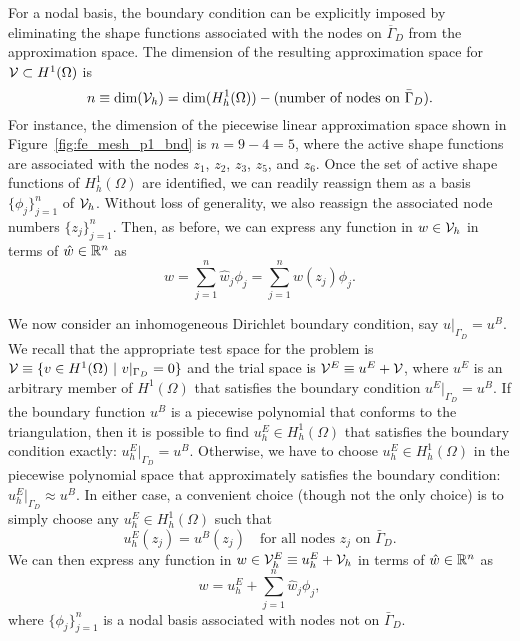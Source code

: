 For a nodal basis, the boundary condition can be explicitly imposed by eliminating the shape functions associated with the nodes on $\overline \Gamma_D$ from the approximation space. The dimension of the resulting approximation space for $\mathcal{V} \subset H^1(\Omega)$ is
\begin{equation*}
  n \equiv \text{dim}(\mathcal{V}_h) = \text{dim}(H^1_h(\Omega)) - (\text{number of nodes on $\bar \Gamma_D$}).
\end{equation*}
For instance, the dimension of the piecewise linear approximation space shown in Figure~\ref{fig:fe_mesh_p1_bnd} is $n = 9 - 4 = 5$, where the active shape functions are associated with the nodes $z_1$, $z_2$, $z_3$, $z_5$, and $z_6$. Once the set of active shape functions of $H^1_h(\Omega)$ are identified, we can readily reassign them as a basis $\{ \phi_j \}_{j=1}^n$ of $\mathcal{V}_h$. Without loss of generality, we also reassign the associated node numbers $\{z_j\}_{j=1}^n$. Then, as before, we can express any function in $w \in \mathcal{V}_h$ in terms of $\hat w \in \mathbb{R}^n$ as
\begin{equation*}
  w = \sum_{j=1}^{n} \hat w_j \phi_j = \sum_{j=1}^{n} w(z_j) \phi_j.
\end{equation*}

We now consider an inhomogeneous Dirichlet boundary condition, say $u|_{\Gamma_D} = u^B$. We recall that the appropriate test space for the problem is $\calV \equiv \{ v \in H^1(\Omega) \ | \ v|_{\Gamma_D} = 0 \}$ and the trial space is $\mathcal{V}^E \equiv u^E + \mathcal{V}$, where $u^E$ is an arbitrary member of $H^1(\Omega)$ that satisfies the boundary condition $u^E|_{\Gamma_D} = u^B$.  If the boundary function $u^B$ is a piecewise polynomial that conforms to the triangulation, then it is possible to find $u^E_h \in H^1_h(\Omega)$ that satisfies the boundary condition exactly: $u^E_h|_{\Gamma_D} = u^B$.  Otherwise, we have to choose $u^E_h \in H^1_h(\Omega)$ in the piecewise polynomial space that approximately satisfies the boundary condition: $u^E_h|_{\Gamma_D} \approx u^B$.  In either case, a convenient choice (though not the only choice) is to simply choose any $u^E_h \in H^1_h(\Omega)$ such that
\begin{equation*}
  u^E_h(z_j) = u^B(z_j) \quad \text{for all nodes } z_j \text{ on } \bar \Gamma_D.
\end{equation*}
We can then express any function in $w \in \mathcal{V}_h^E \equiv u_h^E + \mathcal{V}_h$ in terms of $\hat w \in \mathbb{R}^n$ as
\begin{equation*}
  w = u^E_h + \sum_{j=1}^n \hat w_j \phi_j,
\end{equation*}
where $\{\phi_j\}_{j=1}^n$ is a nodal basis associated with nodes not on $\bar \Gamma_D$.


